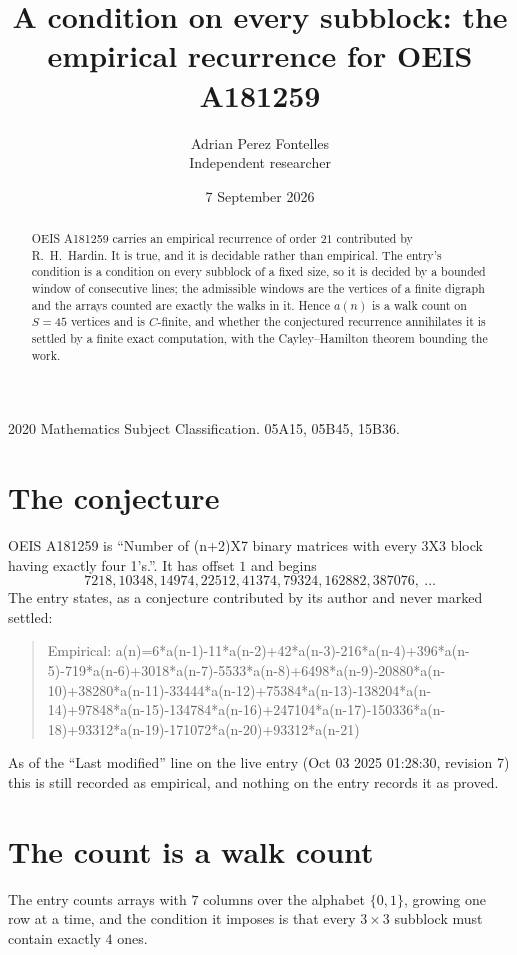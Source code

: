 \documentclass[11pt,a4paper]{article}
\title{A condition on every subblock: the empirical recurrence for OEIS A181259}
\author{Adrian Perez Fontelles\\ \small Independent researcher}
\date{7 September 2026}
\theoremstyle{plain}
\theoremstyle{definition}
\begin{document}
\maketitle

\begin{abstract}
OEIS A181259 carries an empirical recurrence of order $21$ contributed by R.~H.~Hardin. It is
true, and it is decidable rather than empirical. The entry's condition is a condition on every
subblock of a fixed size, so it is decided by a bounded window of consecutive lines; the
admissible windows are the vertices of a finite digraph and the arrays counted are exactly the
walks in it. Hence $a(n)$ is a walk count on $S=45$ vertices and is $C$-finite, and whether the
conjectured recurrence annihilates it is settled by a finite exact computation, with the
Cayley--Hamilton theorem bounding the work.
\end{abstract}

\noindent\small 2020 Mathematics Subject Classification. 05A15, 05B45, 15B36.\normalsize

\section{The conjecture}

OEIS A181259 is ``Number of (n+2)X7 binary matrices with every 3X3 block having exactly four 1's.''. It has offset $1$ and begins
\[
7218, 10348, 14974, 22512, 41374, 79324, 162882, 387076,\ \dots
\]
The entry states, as a conjecture contributed by its author and never marked settled:
\begin{quote}
Empirical: a(n)=6*a(n-1)-11*a(n-2)+42*a(n-3)-216*a(n-4)+396*a(n-5)-719*a(n-6)+3018*a(n-7)-5533*a(n-8)+6498*a(n-9)-20880*a(n-10)+38280*a(n-11)-33444*a(n-12)+75384*a(n-13)-138204*a(n-14)+97848*a(n-15)-134784*a(n-16)+247104*a(n-17)-150336*a(n-18)+93312*a(n-19)-171072*a(n-20)+93312*a(n-21)
\end{quote}
As of the ``Last modified'' line on the live entry (Oct 03 2025 01:28:30, revision 7) this is still
recorded as empirical, and nothing on the entry records it as proved.

\section{The count is a walk count}

The entry counts arrays with $7$ columns over the alphabet $\{0,1\}$, growing one row at a time, and the condition it imposes is that every $3\times3$ subblock must contain exactly $4$ ones.
\end{document}
